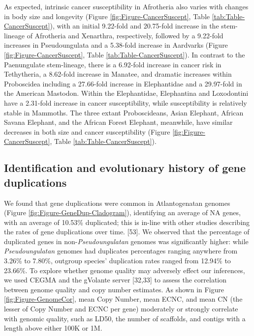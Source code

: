 \documentclass[]{elsarticle} %
\begin{document}
As expected, intrinsic cancer susceptibility in Afrotheria also varies with changes in body size and longevity (Figure \ref{fig:Figure-CancerSuscept}, Table \ref{tab:Table-CancerSuscept}), with an initial 9.22-fold and 20.75-fold increase in the stem-lineage of Afrotheria and Xenarthra, respectively, followed by a 9.22-fold increases in Pseudoungulata and a 5.38-fold increase in Aardvarks (Figure \ref{fig:Figure-CancerSuscept}, Table \ref{tab:Table-CancerSuscept}). In contrast to the Paenungulate stem-lineage, there is a 6.92-fold increase in cancer risk in Tethytheria, a 8.62-fold increase in Manatee, and dramatic increases within Proboscidea including a 27.66-fold increase in Elephantidae and a 29.97-fold in the American Mastodon. Within the Elephantidae, Elephantina and Loxodontini have a 2.31-fold increase in cancer susceptibility, while susceptibility is relatively stable in Mammoths. The three extant Proboscideans, Asian Elephant, African Savana Elephant, and the African Forest Elephant, meanwhile, have similar decreases in both size and cancer susceptibility (Figure \ref{fig:Figure-CancerSuscept}, Table \ref{tab:Table-CancerSuscept}).

\hypertarget{identification-and-evolutionary-history-of-gene-duplications}{%
\subsection{Identification and evolutionary history of gene duplications}\label{identification-and-evolutionary-history-of-gene-duplications}}

We found that gene duplications were common in Atlantogenatan genomes (Figure \ref{fig:Figure-GeneDup-Cladogram}), identifying an average of NA genes, with an average of 10.53\% duplicated; this is in-line with other studies describing the rates of gene duplications over time. {[}53{]}. We observed that the percentage of duplicated genes in non-\emph{Pseudoungulatan} genomes was significantly higher: while \emph{Pseudoungulatan} genomes had duplicates percentages ranging anywhere from 3.26\% to 7.80\%, outgroup species' duplication rates ranged from 12.94\% to 23.66\%. To explore whether genome quality may adversely effect our inferences, we used CEGMA and the gVolante server {[}32,33{]} to assess the correlation between genome quality and copy number estimates. As shown in Figure \ref{fig:Figure-GenomeCor}, mean Copy Number, mean ECNC, and mean CN (the lesser of Copy Number and ECNC per gene) moderately or strongly correlate with genomic quality, such as LD50, the number of scaffolds, and contigs with a length above either 100K or 1M.
\end{document}
